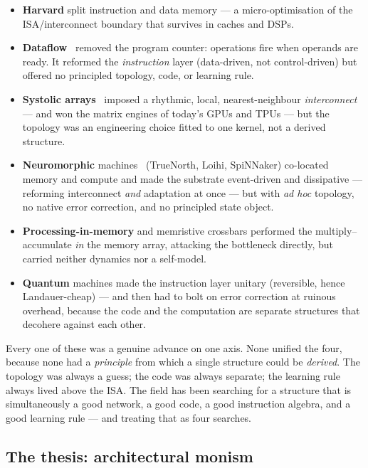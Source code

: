 \begin{itemize}[leftmargin=1.5em,itemsep=1pt]
  \item \textbf{Harvard} split instruction and data memory --- a
        micro-optimisation of the ISA/interconnect boundary that survives in
        caches and DSPs.
  \item \textbf{Dataflow}~\cite{dennis1975} removed the program counter:
        operations fire when operands are ready. It reformed the
        \emph{instruction} layer (data-driven, not control-driven) but
        offered no principled topology, code, or learning rule.
  \item \textbf{Systolic arrays}~\cite{kung1982} imposed a rhythmic,
        local, nearest-neighbour \emph{interconnect} --- and won the matrix
        engines of today's GPUs and TPUs --- but the topology was an
        engineering choice fitted to one kernel, not a derived structure.
  \item \textbf{Neuromorphic} machines~\cite{mead1990} (TrueNorth, Loihi,
        SpiNNaker) co-located memory and compute and made the substrate
        event-driven and dissipative --- reforming interconnect
        \emph{and} adaptation at once --- but with \emph{ad hoc} topology,
        no native error correction, and no principled state object.
  \item \textbf{Processing-in-memory} and memristive crossbars performed the
        multiply--accumulate \emph{in} the memory array, attacking the
        bottleneck directly, but carried neither dynamics nor a self-model.
  \item \textbf{Quantum} machines made the instruction layer unitary
        (reversible, hence Landauer-cheap) --- and then had to bolt on
        error correction at ruinous overhead, because the code and the
        computation are separate structures that decohere against each other.
\end{itemize}

Every one of these was a genuine advance on one axis. None unified the four,
because none had a \emph{principle} from which a single structure could be
\emph{derived}. The topology was always a guess; the code was always
separate; the learning rule always lived above the ISA. The field has been
searching for a structure that is simultaneously a good network, a good
code, a good instruction algebra, and a good learning rule --- and treating
that as four searches.

\subsection{The thesis: architectural monism}

